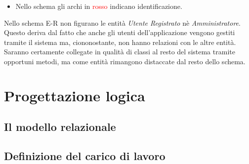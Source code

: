 \documentclass[12pt,a4paper,onecolumn,x11names]{article}
\begin{document}
	\begin{itemize}
		\item Nello schema gli archi in \textcolor{red}{rosso} indicano identificazione.
	\end{itemize}
	
	\begin{flushleft}
		Nello schema E-R non figurano le entità \textit{Utente Registrato} nè \textit{Amministratore}. Questo deriva dal fatto che anche gli utenti dell'applicazione vengono gestiti tramite il sistema ma, ciononostante, non hanno relazioni con le altre entità. Saranno certamente collegate in qualità di classi al resto del sistema tramite opportuni metodi, ma come entità rimangono distaccate dal resto dello schema.
		
	\end{flushleft}
	
		\newpage

\section{Progettazione logica}

\subsection{Il modello relazionale}

\subsection{Definizione del carico di lavoro}
\end{document}

